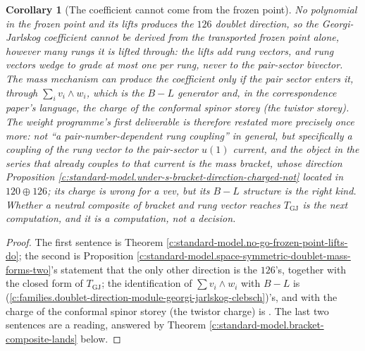 \documentclass[11pt]{article}
\newtheorem{corollary}[theorem]{Corollary}
\theoremstyle{definition}
\theoremstyle{plain}
\newcommand{\changedmark}[2]{\marginpar{\raggedright\scriptsize\color{#1}#2}}
\begin{document}
\begin{corollary}[The coefficient cannot come from the frozen point]\label{c:standard-model.coefficient-cannot-come-frozen-point}
\changedmark{gray}{reworded}
No polynomial in the frozen point and its lifts produces the $126$ doublet direction, so the Georgi-Jarlskog coefficient cannot be derived from the transported frozen point alone, however many rungs it is lifted through: the lifts add rung vectors, and rung vectors wedge to grade at most one per rung, never to the pair-sector bivector. The mass mechanism can produce the coefficient only if the pair sector enters it, through $\sum_{i}v_{i}\wedge w_{i}$, which is the $B - L$ generator and, in the correspondence paper's language, the charge of the conformal spinor storey (the twistor storey). The weight programme's first deliverable is therefore restated more precisely once more: not ``a pair-number-dependent rung coupling'' in general, but specifically a coupling of the rung vector to the pair-sector $u(1)$ current, and the object in the series that already couples to that current is the mass bracket, whose direction Proposition \ref{c:standard-model.under-s-bracket-direction-charged-not} located in $120 \oplus 126$; its charge is wrong for a vev, but its $B - L$ structure is the right kind. Whether a neutral composite of bracket and rung vector reaches $T_{\mathrm{GJ}}$ is the next computation, and it is a computation, not a decision.
\end{corollary}
\begin{proof}
The first sentence is Theorem \ref{c:standard-model.no-go-frozen-point-lifts-do}; the second is Proposition \ref{c:standard-model.space-symmetric-doublet-mass-forms-two}'s statement that the only other direction is the $126$'s, together with the closed form of $T_{\mathrm{GJ}}$; the identification of $\sum v_{i}\wedge w_{i}$ with $B - L$ is \cite[Prop.~8.1]{ButlerT13} (\ref{c:families.doublet-direction-module-georgi-jarlskog-clebsch})'s, and with the charge of the conformal spinor storey (the twistor charge) is \cite[\S 3]{ButlerT9}. The last two sentences are a reading, answered by Theorem \ref{c:standard-model.bracket-composite-lands} below.

\end{proof}
\end{document}

